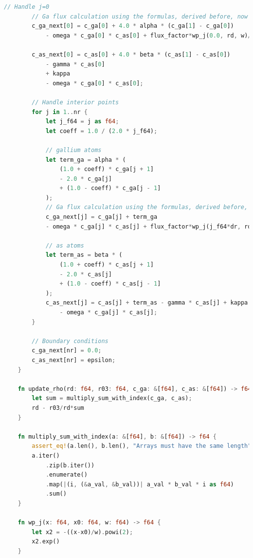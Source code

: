 \documentclass[14pt,oneside]{extarticle}
\begin{document}
\begin{lstlisting}[language=Rust]
        // Handle j=0
        // Ga flux calculation using the formulas, derived before, now gives a correct result
        c_ga_next[0] = c_ga[0] + 4.0 * alpha * (c_ga[1] - c_ga[0])
            - omega * c_ga[0] * c_as[0] + flux_factor*wp_j(0.0, rd, w)/(3.545*rd/w+0.187*w/(r_inf-3.156*w))/(r_inf/rd).ln();
        
        c_as_next[0] = c_as[0] + 4.0 * beta * (c_as[1] - c_as[0]) 
            - gamma * c_as[0] 
            + kappa 
            - omega * c_ga[0] * c_as[0];
    
        // Handle interior points
        for j in 1..nr {
            let j_f64 = j as f64;
            let coeff = 1.0 / (2.0 * j_f64);
            
            // gallium atoms
            let term_ga = alpha * (
                (1.0 + coeff) * c_ga[j + 1] 
                - 2.0 * c_ga[j] 
                + (1.0 - coeff) * c_ga[j - 1]
            );
            // Ga flux calculation using the formulas, derived before, now gives a correct result
            c_ga_next[j] = c_ga[j] + term_ga
            - omega * c_ga[j] * c_as[j] + flux_factor*wp_j(j_f64*dr, rd, w)/(3.545*rd/w+0.187*w/(r_inf-3.156*w))/(r_inf/rd).ln();
            
            // as atoms
            let term_as = beta * (
                (1.0 + coeff) * c_as[j + 1] 
                - 2.0 * c_as[j] 
                + (1.0 - coeff) * c_as[j - 1]
            );
            c_as_next[j] = c_as[j] + term_as - gamma * c_as[j] + kappa 
                - omega * c_ga[j] * c_as[j];
        }
    
        // Boundary conditions
        c_ga_next[nr] = 0.0;
        c_as_next[nr] = epsilon;
    }
    
    fn update_rho(rd: f64, r03: f64, c_ga: &[f64], c_as: &[f64]) -> f64 {
        let sum = multiply_sum_with_index(c_ga, c_as);
        rd - r03/rd*sum
    }
    
    fn multiply_sum_with_index(a: &[f64], b: &[f64]) -> f64 {
        assert_eq!(a.len(), b.len(), "Arrays must have the same length");
        a.iter()
            .zip(b.iter())
            .enumerate()
            .map(|(i, (&a_val, &b_val))| a_val * b_val * i as f64)
            .sum()
    }
    
    fn wp_j(x: f64, x0: f64, w: f64) -> f64 {
        let x2 = -((x-x0)/w).powi(2);
        x2.exp()
    }    
\end{lstlisting}
\end{document}
